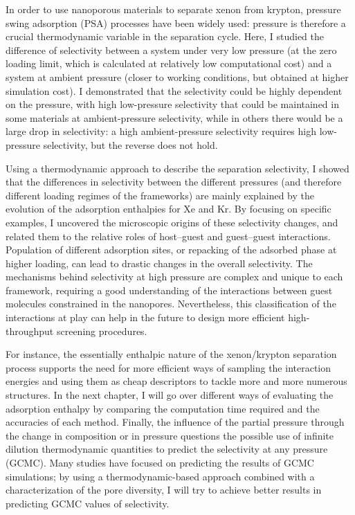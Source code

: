 \documentclass[main.tex]{subfiles}
\begin{document}
In order to use nanoporous materials to separate xenon from krypton, pressure swing adsorption (PSA) processes have been widely used: pressure is therefore a crucial thermodynamic variable in the separation cycle. Here, I studied the difference of selectivity between a system under very low pressure (at the zero loading limit, which is calculated at relatively low computational cost) and a system at ambient pressure (closer to working conditions, but obtained at higher simulation cost). I demonstrated that the selectivity could be highly dependent on the pressure, with high low-pressure selectivity that could be maintained in some materials at ambient-pressure selectivity, while in others there would be a large drop in selectivity: a high ambient-pressure selectivity requires high low-pressure selectivity, but the reverse does not hold.

Using a thermodynamic approach to describe the separation selectivity, I showed that the differences in selectivity between the different pressures (and therefore different loading regimes of the frameworks) are mainly explained by the evolution of the adsorption enthalpies for Xe and Kr. By focusing on specific examples, I uncovered the microscopic origins of these selectivity changes, and related them to the relative roles of host--guest and guest--guest interactions. Population of different adsorption sites, or repacking of the adsorbed phase at higher loading, can lead to drastic changes in the overall selectivity. The mechanisms behind selectivity at high pressure are complex and unique to each framework, requiring a good understanding of the interactions between guest molecules constrained in the nanopores. Nevertheless, this classification of the interactions at play can help in the future to design more efficient high-throughput screening procedures.

For instance, the essentially enthalpic nature of the xenon/krypton separation process supports the need for more efficient ways of sampling the interaction energies and using them as cheap descriptors to tackle more and more numerous structures. In the next chapter, I will go over different ways of evaluating the adsorption enthalpy by comparing the computation time required and the accuracies of each method. Finally, the influence of the partial pressure through the change in composition or in pressure questions the possible use of infinite dilution thermodynamic quantities to predict the selectivity at any pressure (GCMC). Many studies have focused on predicting the results of GCMC simulations;\autocite{Simon_2015,Shi_2023,Kang_2023,Li_2023} by using a thermodynamic-based approach combined with a characterization of the pore diversity, I will try to achieve better results in predicting GCMC values of selectivity.


\OnlyInSubfile{\printglobalbibliography}
\end{document}
